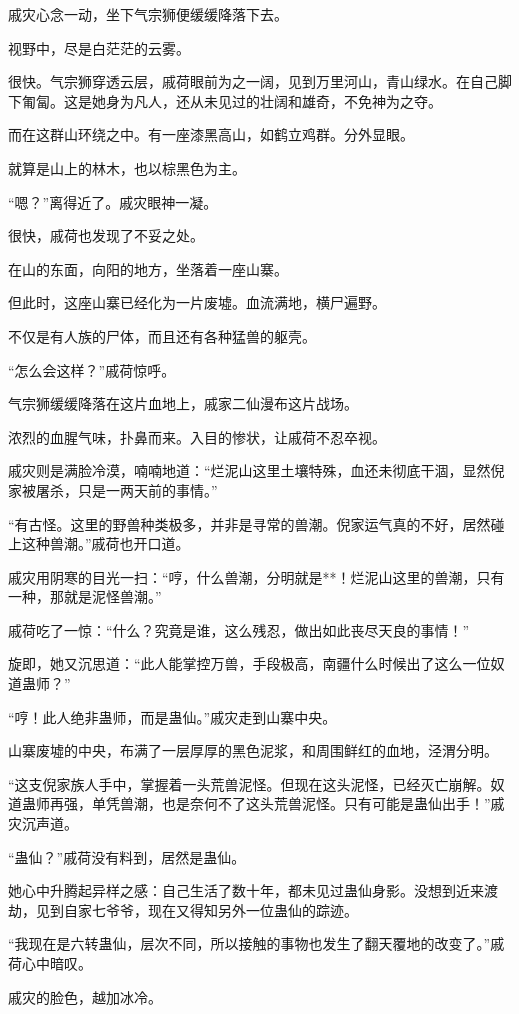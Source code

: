 \begin{this_body}
戚灾心念一动，坐下气宗狮便缓缓降落下去。

视野中，尽是白茫茫的云雾。

很快。气宗狮穿透云层，戚荷眼前为之一阔，见到万里河山，青山绿水。在自己脚下匍匐。这是她身为凡人，还从未见过的壮阔和雄奇，不免神为之夺。

而在这群山环绕之中。有一座漆黑高山，如鹤立鸡群。分外显眼。

就算是山上的林木，也以棕黑色为主。

“嗯？”离得近了。戚灾眼神一凝。

很快，戚荷也发现了不妥之处。

在山的东面，向阳的地方，坐落着一座山寨。

但此时，这座山寨已经化为一片废墟。血流满地，横尸遍野。

不仅是有人族的尸体，而且还有各种猛兽的躯壳。

“怎么会这样？”戚荷惊呼。

气宗狮缓缓降落在这片血地上，戚家二仙漫布这片战场。

浓烈的血腥气味，扑鼻而来。入目的惨状，让戚荷不忍卒视。

戚灾则是满脸冷漠，喃喃地道：“烂泥山这里土壤特殊，血还未彻底干涸，显然倪家被屠杀，只是一两天前的事情。”

“有古怪。这里的野兽种类极多，并非是寻常的兽潮。倪家运气真的不好，居然碰上这种兽潮。”戚荷也开口道。

戚灾用阴寒的目光一扫：“哼，什么兽潮，分明就是**！烂泥山这里的兽潮，只有一种，那就是泥怪兽潮。”

戚荷吃了一惊：“什么？究竟是谁，这么残忍，做出如此丧尽天良的事情！”

旋即，她又沉思道：“此人能掌控万兽，手段极高，南疆什么时候出了这么一位奴道蛊师？”

“哼！此人绝非蛊师，而是蛊仙。”戚灾走到山寨中央。

山寨废墟的中央，布满了一层厚厚的黑色泥浆，和周围鲜红的血地，泾渭分明。

“这支倪家族人手中，掌握着一头荒兽泥怪。但现在这头泥怪，已经灭亡崩解。奴道蛊师再强，单凭兽潮，也是奈何不了这头荒兽泥怪。只有可能是蛊仙出手！”戚灾沉声道。

“蛊仙？”戚荷没有料到，居然是蛊仙。

她心中升腾起异样之感：自己生活了数十年，都未见过蛊仙身影。没想到近来渡劫，见到自家七爷爷，现在又得知另外一位蛊仙的踪迹。

“我现在是六转蛊仙，层次不同，所以接触的事物也发生了翻天覆地的改变了。”戚荷心中暗叹。

戚灾的脸色，越加冰冷。


\end{this_body}
